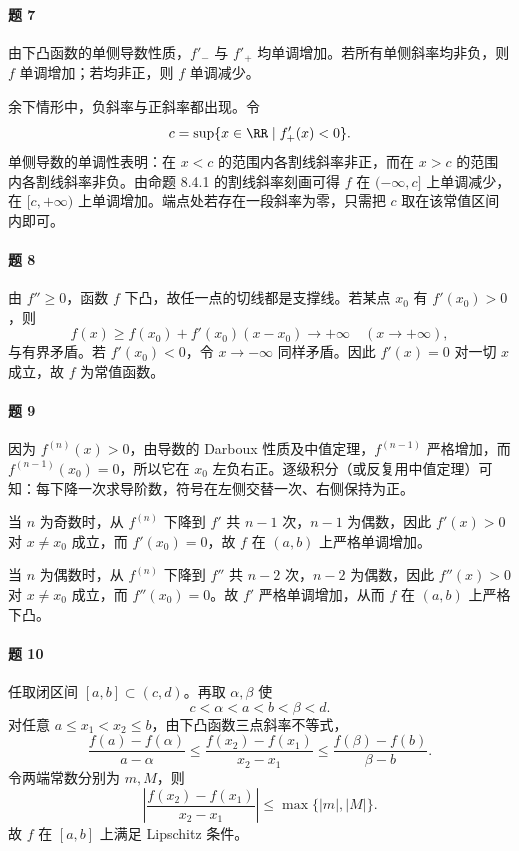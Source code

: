 \paragraph{题 7}
\begin{xsolution}
由下凸函数的单侧导数性质，$f'_-$ 与 $f'_+$ 均单调增加。若所有单侧斜率均非负，则 $f$ 单调增加；若均非正，则 $f$ 单调减少。

余下情形中，负斜率与正斜率都出现。令
\[
  c=\sup\{x\in\RR\mid f'_+(x)<0\}.
\]
单侧导数的单调性表明：在 $x<c$ 的范围内各割线斜率非正，而在 $x>c$ 的范围内各割线斜率非负。由命题 8.4.1 的割线斜率刻画可得 $f$ 在 $(-\infty,c]$ 上单调减少，在 $[c,+\infty)$ 上单调增加。端点处若存在一段斜率为零，只需把 $c$ 取在该常值区间内即可。
\end{xsolution}

\paragraph{题 8}
\begin{xsolution}
由 $f''\ge0$，函数 $f$ 下凸，故任一点的切线都是支撑线。若某点 $x_0$ 有 $f'(x_0)>0$，则
\[
  f(x)\ge f(x_0)+f'(x_0)(x-x_0)\to+\infty
  \quad(x\to+\infty),
\]
与有界矛盾。若 $f'(x_0)<0$，令 $x\to-\infty$ 同样矛盾。因此 $f'(x)=0$ 对一切 $x$ 成立，故 $f$ 为常值函数。
\end{xsolution}

\paragraph{题 9}
\begin{xsolution}
因为 $f^{(n)}(x)>0$，由导数的 Darboux 性质及中值定理，$f^{(n-1)}$ 严格增加，而 $f^{(n-1)}(x_0)=0$，所以它在 $x_0$ 左负右正。逐级积分（或反复用中值定理）可知：每下降一次求导阶数，符号在左侧交替一次、右侧保持为正。

当 $n$ 为奇数时，从 $f^{(n)}$ 下降到 $f'$ 共 $n-1$ 次，$n-1$ 为偶数，因此 $f'(x)>0$ 对 $x\ne x_0$ 成立，而 $f'(x_0)=0$，故 $f$ 在 $(a,b)$ 上严格单调增加。

当 $n$ 为偶数时，从 $f^{(n)}$ 下降到 $f''$ 共 $n-2$ 次，$n-2$ 为偶数，因此 $f''(x)>0$ 对 $x\ne x_0$ 成立，而 $f''(x_0)=0$。故 $f'$ 严格单调增加，从而 $f$ 在 $(a,b)$ 上严格下凸。
\end{xsolution}

\paragraph{题 10}
\begin{xsolution}
任取闭区间 $[a,b]\subset(c,d)$。再取 $\alpha,\beta$ 使
\[
  c<\alpha<a<b<\beta<d.
\]
对任意 $a\le x_1<x_2\le b$，由下凸函数三点斜率不等式，
\[
  \frac{f(a)-f(\alpha)}{a-\alpha}
  \le\frac{f(x_2)-f(x_1)}{x_2-x_1}
  \le\frac{f(\beta)-f(b)}{\beta-b}.
\]
令两端常数分别为 $m,M$，则
\[
  \left|\frac{f(x_2)-f(x_1)}{x_2-x_1}\right|
  \le\max\{|m|,|M|\}.
\]
故 $f$ 在 $[a,b]$ 上满足 Lipschitz 条件。
\end{xsolution}

